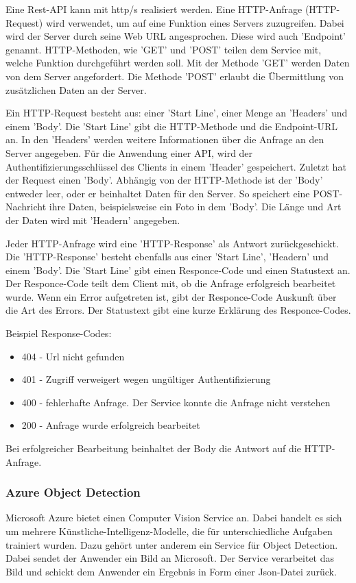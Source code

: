 Eine Rest-API kann mit http/s realisiert werden. Eine HTTP-Anfrage (HTTP-Request) wird verwendet, um auf eine Funktion eines Servers zuzugreifen. Dabei wird der Server durch seine Web URL angesprochen. Diese wird auch 'Endpoint' genannt. HTTP-Methoden, wie 'GET' und 'POST' teilen dem Service mit, welche Funktion durchgeführt werden soll. Mit der Methode 'GET' werden Daten von dem Server angefordert. Die Methode 'POST' erlaubt die Übermittlung von zusätzlichen Daten an der Server.

Ein HTTP-Request besteht aus: einer 'Start Line', einer Menge an 'Headers' und einem 'Body'. Die 'Start Line' gibt die HTTP-Methode und die Endpoint-URL an.
In den 'Headers' werden weitere Informationen über die Anfrage an den Server angegeben. Für die Anwendung einer API, wird der Authentifizierungsschlüssel des Clients in einem 'Header' gespeichert.
Zuletzt hat der Request einen 'Body'. Abhängig von der HTTP-Methode ist der 'Body' entweder leer, oder er beinhaltet Daten für den Server. So speichert eine POST-Nachricht ihre Daten, beispielsweise ein Foto in dem 'Body'. Die Länge und Art der Daten wird mit 'Headern' angegeben.
  
Jeder HTTP-Anfrage wird eine 'HTTP-Response' als Antwort zurückgeschickt. 
Die 'HTTP-Response' besteht ebenfalls aus einer 'Start Line', 'Headern' und einem 'Body'. Die 'Start Line' gibt einen Responce-Code und einen Statustext an. Der Responce-Code teilt dem Client mit, ob die Anfrage erfolgreich bearbeitet wurde. Wenn ein Error aufgetreten ist, gibt der Responce-Code Auskunft über die Art des Errors. Der Statustext gibt eine kurze Erklärung des Responce-Codes.

Beispiel Response-Codes:
\begin{itemize}
	\item 404 - Url nicht gefunden
	\item 401 - Zugriff verweigert wegen ungültiger Authentifizierung
	\item 400 - fehlerhafte Anfrage. Der Service konnte die Anfrage nicht verstehen
	\item 200 - Anfrage wurde erfolgreich bearbeitet
\end{itemize}

Bei erfolgreicher Bearbeitung beinhaltet der Body die Antwort auf die HTTP-Anfrage.

\subsubsection{Azure Object Detection}
Microsoft Azure bietet einen Computer Vision Service an. Dabei handelt es sich um mehrere Künstliche-Intelligenz-Modelle, die für unterschiedliche Aufgaben trainiert wurden. Dazu gehört unter anderem ein Service für Object Detection. Dabei sendet der Anwender ein Bild an Microsoft. Der Service verarbeitet das Bild und schickt dem Anwender ein Ergebnis in Form einer Json-Datei zurück.\citep{getAzure,whatIsAzure,objDetectAzure,Azure302Doc}

